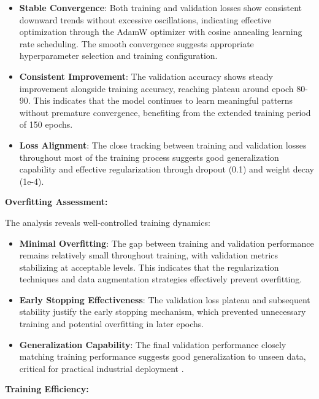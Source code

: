 \begin{itemize}
    \item \textbf{Stable Convergence}: Both training and validation losses show consistent downward trends without excessive oscillations, indicating effective optimization through the AdamW optimizer with cosine annealing learning rate scheduling. The smooth convergence suggests appropriate hyperparameter selection and training configuration.
    
    \item \textbf{Consistent Improvement}: The validation accuracy shows steady improvement alongside training accuracy, reaching plateau around epoch 80-90. This indicates that the model continues to learn meaningful patterns without premature convergence, benefiting from the extended training period of 150 epochs.
    
    \item \textbf{Loss Alignment}: The close tracking between training and validation losses throughout most of the training process suggests good generalization capability and effective regularization through dropout (0.1) and weight decay (1e-4).
\end{itemize}

\textbf{Overfitting Assessment:}

The analysis reveals well-controlled training dynamics:

\begin{itemize}
    \item \textbf{Minimal Overfitting}: The gap between training and validation performance remains relatively small throughout training, with validation metrics stabilizing at acceptable levels. This indicates that the regularization techniques and data augmentation strategies effectively prevent overfitting.
    
    \item \textbf{Early Stopping Effectiveness}: The validation loss plateau and subsequent stability justify the early stopping mechanism, which prevented unnecessary training and potential overfitting in later epochs.
    
    \item \textbf{Generalization Capability}: The final validation performance closely matching training performance suggests good generalization to unseen data, critical for practical industrial deployment \citep{krawczyk2016learning}.
\end{itemize}

\textbf{Training Efficiency:}


